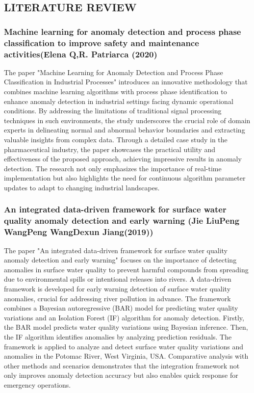 \documentclass[12pt]{report}
\begin{document}
\subsection{\centering LITERATURE REVIEW}
\par
\subsubsection{Machine learning for anomaly detection and process phase
classification to improve safety and maintenance activities(Elena Q,R. Patriarca (2020)}
The paper "Machine Learning for Anomaly Detection and Process Phase Classification in Industrial Processes" \cite{ml_paper1} introduces an innovative methodology that combines machine learning algorithms with process phase identification to enhance anomaly detection in industrial settings facing dynamic operational conditions. By addressing the limitations of traditional signal processing techniques in such environments, the study underscores the crucial role of domain experts in delineating normal and abnormal behavior boundaries and extracting valuable insights from complex data. Through a detailed case study in the pharmaceutical industry, the paper showcases the practical utility and effectiveness of the proposed approach, achieving impressive results in anomaly detection. The research not only emphasizes the importance of real-time implementation but also highlights the need for continuous algorithm parameter updates to adapt to changing industrial landscapes.

\subsubsection{An integrated data-driven framework for surface water quality anomaly detection and early warning (Jie LiuPeng WangPeng WangDexun Jiang(2019))}
\par
The paper "An integrated data-driven framework for surface water quality anomaly detection and early warning" \cite{paper2} focuses on the importance of detecting anomalies in surface water quality to prevent harmful compounds from spreading due to environmental spills or intentional releases into rivers. A data-driven framework is developed for early warning detection of surface water quality anomalies, crucial for addressing river pollution in advance. The framework combines a Bayesian autoregressive (BAR) model for predicting water quality variations and an Isolation Forest (IF) algorithm for anomaly detection. Firstly, the BAR model predicts water quality variations using Bayesian inference. Then, the IF algorithm identifies anomalies by analyzing prediction residuals. The framework is applied to analyze and detect surface water quality variations and anomalies in the Potomac River, West Virginia, USA. Comparative analysis with other methods and scenarios demonstrates that the integration framework not only improves anomaly detection accuracy but also enables quick response for emergency operations.
\end{document}
